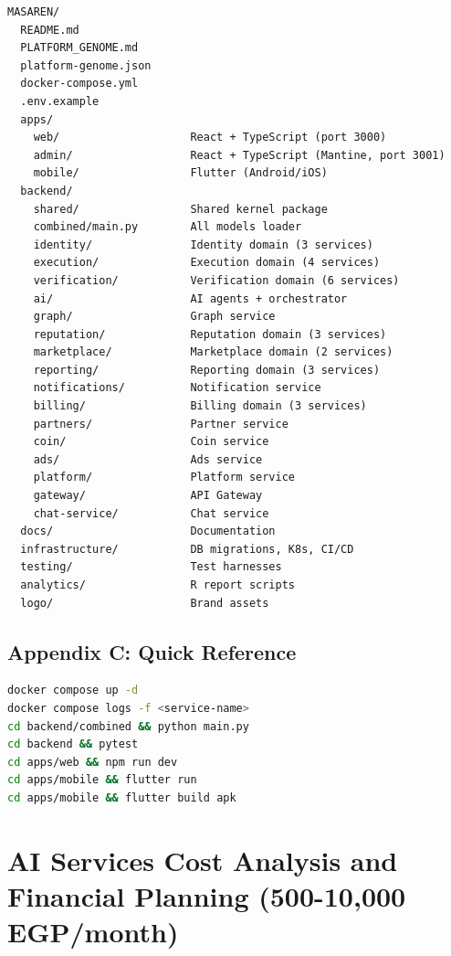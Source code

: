 \documentclass[11pt,a4paper]{article}
\begin{document}
\begin{verbatim}
MASAREN/
  README.md
  PLATFORM_GENOME.md
  platform-genome.json
  docker-compose.yml
  .env.example
  apps/
    web/                    React + TypeScript (port 3000)
    admin/                  React + TypeScript (Mantine, port 3001)
    mobile/                 Flutter (Android/iOS)
  backend/
    shared/                 Shared kernel package
    combined/main.py        All models loader
    identity/               Identity domain (3 services)
    execution/              Execution domain (4 services)
    verification/           Verification domain (6 services)
    ai/                     AI agents + orchestrator
    graph/                  Graph service
    reputation/             Reputation domain (3 services)
    marketplace/            Marketplace domain (2 services)
    reporting/              Reporting domain (3 services)
    notifications/          Notification service
    billing/                Billing domain (3 services)
    partners/               Partner service
    coin/                   Coin service
    ads/                    Ads service
    platform/               Platform service
    gateway/                API Gateway
    chat-service/           Chat service
  docs/                     Documentation
  infrastructure/           DB migrations, K8s, CI/CD
  testing/                  Test harnesses
  analytics/                R report scripts
  logo/                     Brand assets
\end{verbatim}

\subsection{Appendix C: Quick Reference}

\begin{lstlisting}[language=bash, caption=Common Development Commands]
docker compose up -d
docker compose logs -f <service-name>
cd backend/combined && python main.py
cd backend && pytest
cd apps/web && npm run dev
cd apps/mobile && flutter run
cd apps/mobile && flutter build apk
\end{lstlisting}

\clearpage

\section{AI Services Cost Analysis and Financial Planning (500-10,000 EGP/month)}
\end{document}
